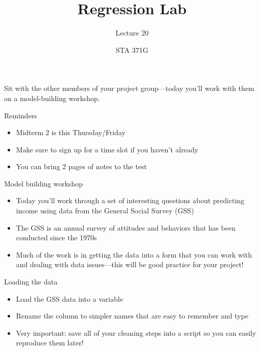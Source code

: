 \documentclass{beamer}\usepackage[]{graphicx}\usepackage[]{color}
\title{Regression Lab}
\subtitle{Lecture 20}
\author{STA 371G}
\begin{document}
  
  

  \frame{\maketitle}



  \begin{darkframes}
    \begin{frame}
      \begin{center}
        Sit with the other members of your project group---today you'll work with them on a model-building workshop.
      \end{center}
    \end{frame}

    \begin{frame}{Reminders}
      \begin{itemize}
        \item Midterm 2 is this Thursday/Friday
        \item Make sure to sign up for a time slot if you haven't already
        \item You can bring 2 pages of notes to the test
      \end{itemize}
    \end{frame}

    \begin{frame}{Model building workshop}
      \begin{itemize}
        \item Today you'll work through a set of interesting questions about predicting income using data from the General Social Survey (GSS)
        \item The GSS is an annual survey of attitudes and behaviors that has been conducted since the 1970s
        \item Much of the work is in getting the data into a form that you can work with and dealing with data issues---this will be good practice for your project!
      \end{itemize}
    \end{frame}

    \begin{frame}{Loading the data}
      \begin{itemize}
        \item Load the GSS data into a variable
        \item Rename the column to simpler names that are easy to remember and type
        \item \alert{Very important:} save all of your cleaning steps into a script so you can easily reproduce them later!
      \end{itemize}
    \end{frame}


\end{darkframes}
\end{document}
